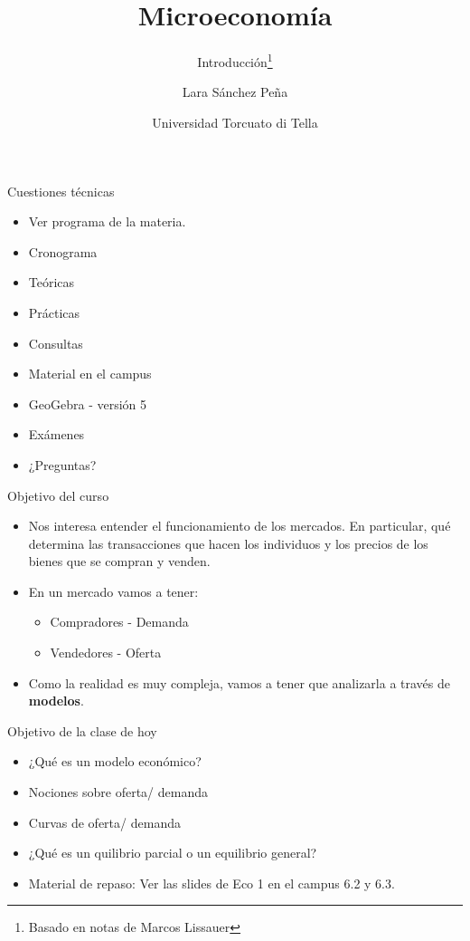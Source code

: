\documentclass{beamer}
\title{Microeconomía}
\subtitle{Introducción\footnote{Basado en notas de Marcos Lissauer}\\ \mydate}
\author[Introducción]{Lara Sánchez Peña}
\date{ Universidad Torcuato di Tella}
\begin{document}
	\frame{\titlepage}

\begin{frame}{Cuestiones técnicas}
    \begin{itemize}
        \item Ver programa de la materia.
        \item Cronograma
        \item Teóricas 
        \item Prácticas
        \item Consultas
        \item Material en el campus
        \item GeoGebra - versión 5
        \item Exámenes
        \item ¿Preguntas?
    \end{itemize}
\end{frame}

\begin{frame}{Objetivo del curso}
\begin{itemize}
    \item Nos interesa entender el funcionamiento de los mercados. En particular, qué determina las transacciones que hacen los individuos y los precios de los bienes que se compran y venden.
    \item En un mercado vamos a tener: 
    \begin{itemize}
        \item Compradores - Demanda
        \item Vendedores - Oferta
    \end{itemize}
    \item Como la realidad es muy compleja, vamos a tener que analizarla a través de \textbf{modelos}. 
\end{itemize}
\end{frame}

\begin{frame}{Objetivo de la clase de hoy}
    \begin{itemize}
        \item ¿Qué es un modelo económico?
        \item Nociones sobre oferta/ demanda
        \item Curvas de oferta/ demanda
        \item ¿Qué es un quilibrio parcial o un equilibrio general?
        \item Material de repaso: Ver las slides de Eco 1 en el campus 6.2 y 6.3.
    \end{itemize}
\end{frame}
\end{document}
